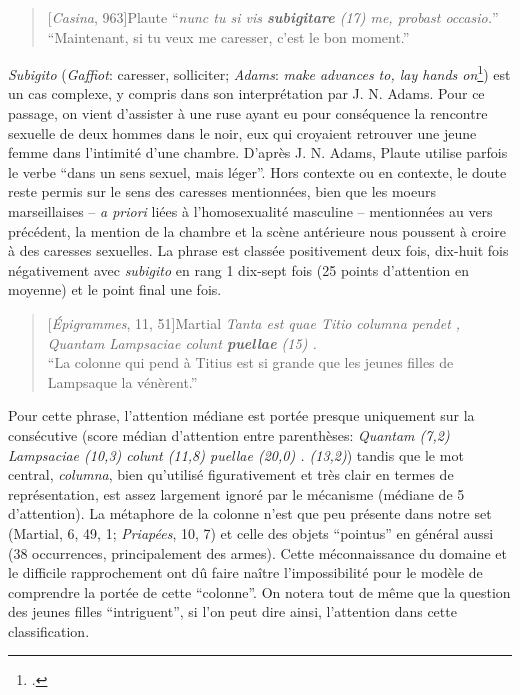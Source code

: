 \starbreak

\begin{quote}[\textit{Casina}, 963]{Plaute}
    \enquote{\textit{nunc tu si vis \textbf{subigitare} (17) me, probast occasio.}} \\
    \enquote{Maintenant, si tu veux me caresser, c'est le bon moment.}
\end{quote}

\textit{Subigito} (\textit{Gaffiot}: caresser, solliciter; \textit{Adams}: \textit{make advances to, lay hands on}\footcite[p. 323]{adams_prostitute}) est un cas complexe, y compris dans son interprétation par J. N. Adams. Pour ce passage, on vient d'assister à une ruse ayant eu pour conséquence la rencontre sexuelle de deux hommes dans le noir, eux qui croyaient retrouver une jeune femme dans l'intimité d'une chambre. D'après J. N. Adams, Plaute utilise parfois le verbe ``dans un sens sexuel, mais léger''. Hors contexte ou en contexte, le doute reste permis sur le sens des caresses mentionnées, bien que les moeurs marseillaises -- \textit{a priori} liées à l'homosexualité masculine -- mentionnées au vers précédent, la mention de la chambre et la scène antérieure nous poussent à croire à des caresses sexuelles. La phrase est classée positivement deux fois, dix-huit fois négativement avec \textit{subigito} en rang 1 dix-sept fois (25 points d'attention en moyenne) et le point final une fois.

\starbreak

\begin{quote}[\textit{Épigrammes}, 11, 51]{Martial}
\textit{Tanta est quae Titio columna pendet , Quantam Lampsaciae colunt \textbf{puellae} (15) .}\\
\enquote{La colonne qui pend à Titius est si grande que les jeunes filles de Lampsaque la vénèrent.}
\end{quote}

Pour cette phrase, l'attention médiane est portée presque uniquement sur la consécutive (score médian d'attention entre parenthèses: \textit{Quantam (7,2) Lampsaciae (10,3) colunt (11,8) puellae (20,0) . (13,2)}) tandis que le mot central, \textit{columna}, bien qu'utilisé figurativement et très clair en termes de représentation, est assez largement ignoré par le mécanisme (médiane de 5 d'attention). La métaphore de la colonne n'est que peu présente dans notre set (Martial, 6, 49, 1; \textit{Priapées}, 10, 7) et celle des objets ``pointus'' en général aussi (38 occurrences, principalement des armes). Cette méconnaissance du domaine et le difficile rapprochement ont dû faire naître l'impossibilité pour le modèle de comprendre la portée de cette ``colonne''. On notera  tout de même que la question des jeunes filles ``intriguent'', si l'on peut dire ainsi, l'attention dans cette classification.

